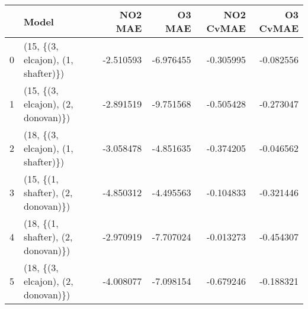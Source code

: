 \begin{tabular}{llrrrr}
\toprule
{} &                               Model &   NO2 MAE &    O3 MAE &  NO2 CvMAE &  O3 CvMAE \\
\midrule
0 &  (15, \{(3, elcajon), (1, shafter)\}) & -2.510593 & -6.976455 &  -0.305995 & -0.082556 \\
1 &  (15, \{(3, elcajon), (2, donovan)\}) & -2.891519 & -9.751568 &  -0.505428 & -0.273047 \\
2 &  (18, \{(3, elcajon), (1, shafter)\}) & -3.058478 & -4.851635 &  -0.374205 & -0.046562 \\
3 &  (15, \{(1, shafter), (2, donovan)\}) & -4.850312 & -4.495563 &  -0.104833 & -0.321446 \\
4 &  (18, \{(1, shafter), (2, donovan)\}) & -2.970919 & -7.707024 &  -0.013273 & -0.454307 \\
5 &  (18, \{(3, elcajon), (2, donovan)\}) & -4.008077 & -7.098154 &  -0.679246 & -0.188321 \\
\bottomrule
\end{tabular}
